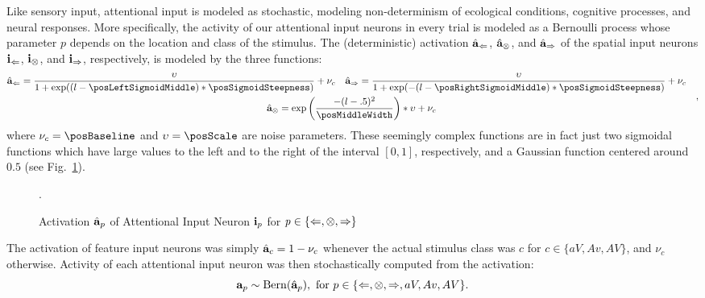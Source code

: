         Like sensory input, attentional input is modeled as stochastic, modeling non-determinism of ecological conditions, cognitive processes, and neural responses.
        More specifically, the activity of our attentional input neurons in every trial is modeled as a Bernoulli process whose parameter $p$ depends on the location and class of the stimulus.
        The (deterministic) activation $\hat{\mathbf{a}}_{\Leftarrow}$, $\hat{\mathbf{a}}_{\otimes}$, and $\hat{\mathbf{a}}_{\Rightarrow}$ of the spatial input neurons $\mathbf{i}_{\Leftarrow}$, $\mathbf{i}_{\otimes}$, and $\mathbf{i}_{\Rightarrow}$, respectively, is modeled by the three functions:
        \begin{equation}
            \begin{gathered}
                \begin{aligned}
                \hat{\nact{a}}_{\clLeft}    &=\frac{\upsilon}{1 + \exp((\propv{l} - \posLeftSigmoidMiddle)*\posSigmoidSteepness)} + \nu_c &
                \hat{\nact{a}}_{\clRight}   &=\frac{\upsilon}{1 + \exp(-(\propv{l} - \posRightSigmoidMiddle)*\posSigmoidSteepness)} + \nu_c
                \end{aligned} \\
                \hat{\nact{a}}_{\clCenter}  = \exp\left(\frac{-(\propv{l} - .5)^2}{\posMiddleWidth}\right) * \upsilon + \nu_c
            \end{gathered},
        \end{equation}
        where $\nu_c=\posBaseline$ and $\upsilon=\posScale$ are noise parameters.
        These seemingly complex functions are in fact just two sigmoidal functions which have large values to the left and to the right of the interval $[0,1]$, respectively, and a Gaussian function centered around $0.5$ (see Fig.~\ref{fig:spatial-cogn-input}).
        \begin{figure}
            \centering
            \caption{Activation $\hat{\mathbf{a}}_p$ of Attentional Input Neuron $\mathbf{i}_p$ for $\mathit{p}\in\{\Leftarrow,\otimes,\Rightarrow\}$}\label{fig:spatial-cogn-input}.
        \end{figure}
        The activation of feature input neurons was simply $\hat{\mathbf{a}}_c=1-\nu_c$ whenever the actual stimulus class was $c$ for $c\in \{aV, Av, AV\}$, and $\nu_c$ otherwise.
        Activity of each attentional input neuron was then stochastically computed from the activation:
        \[
            \mathbf{a}_p\sim\mathop{\mathrm{Bern}}(\hat{\mathbf{a}}_p),\text{ for }p\in\{\Leftarrow,\otimes,\Rightarrow,aV,Av,AV\}.
        \]

